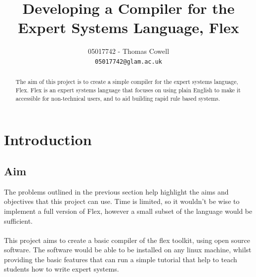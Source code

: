 \documentclass[12pt]{report}
\begin{document}
\title{Developing a Compiler for the Expert Systems Language, Flex}
\author{05017742 - Thomas Cowell\\
		\texttt{05017742@glam.ac.uk}}

\maketitle

\begin{abstract}
The aim of this project is to create a simple compiler for the expert systems language, Flex.  Flex is an expert systems language that focuses on using plain English to make it accessible for non-technical users, and to aid building rapid rule based systems.
\end{abstract}

\pagestyle{plain}

\tableofcontents

\cleardoublepage
{}

\chapter{Introduction}
\section{Aim}\label{sec:aim}
The problems outlined in the previous section help highlight the aims and objectives that this project can use.  Time is limited, so it wouldn't be wise to implement a full version of Flex, however a small subset of the language would be sufficient.
\\
\\
This project aims to create a basic compiler of the flex toolkit, using open source software.  The software would be able to be installed on any linux machine, whilst providing the basic features that can run a simple tutorial that help to teach students how to write expert systems.
\clearpage
\end{document}
